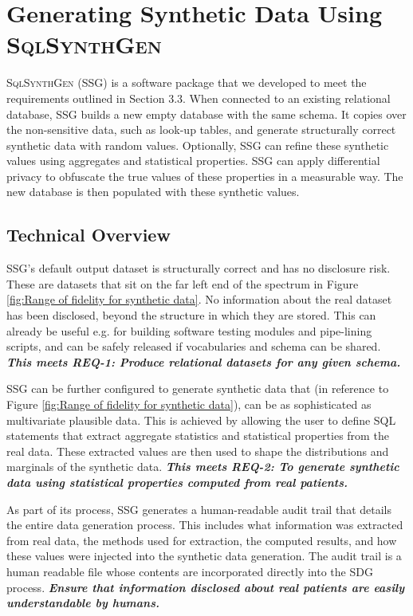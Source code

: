 \documentclass[11pt]{article}
\begin{document}
\section{Generating Synthetic Data Using \textsc{SqlSynthGen}}

\textsc{SqlSynthGen} (SSG) is a software package that we developed to meet the requirements outlined in Section 3.3. When connected to an existing relational database, SSG builds a new empty database with the same schema. It copies over the non-sensitive data, such as look-up tables, and generate structurally correct synthetic data with random values. Optionally, SSG can refine these synthetic values using aggregates and statistical properties. SSG can apply differential privacy to obfuscate the true values of these properties in a measurable way. The new database is then populated with these synthetic values.  

\subsection{Technical Overview}

SSG's default output dataset is structurally correct and has no disclosure risk. These are datasets that sit on the far left end of the spectrum in Figure \ref{fig:Range of fidelity for synthetic data}. No information about the real dataset has been disclosed, beyond the structure in which they are stored. This can already be useful e.g. for building software testing modules and pipe-lining scripts, and can be safely released if vocabularies and schema can be shared. \textbf{\textit{This meets REQ-1: Produce relational datasets for any given schema.}}

SSG can be further configured to generate synthetic data that (in reference to Figure \ref{fig:Range of fidelity for synthetic data}), can be as sophisticated as multivariate plausible data. This is achieved by allowing the user to define SQL statements that extract aggregate statistics and statistical properties from the real data. These extracted values are then used to shape the distributions and marginals of the synthetic data. \textbf{\textit{This meets REQ-2: To generate synthetic data using statistical properties computed from real patients.}} 

As part of its process, SSG generates a human-readable audit trail that details the entire data generation process. This includes what information was extracted from real data, the methods used for extraction, the computed results, and how these values were injected into the synthetic data generation. The audit trail is a human readable file whose contents are incorporated directly into the SDG process. \textbf{\textit{Ensure that information disclosed about real patients are easily understandable by humans.}}
\end{document}
